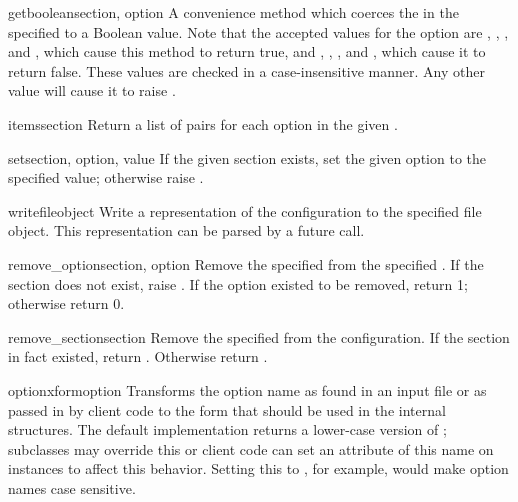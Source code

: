 \begin{methoddesc}{getboolean}{section, option}
A convenience method which coerces the  in the specified
 to a Boolean value.  Note that the accepted values
for the option are , , , and ,
which cause this method to return true, and , ,
, and , which cause it to return false.  These
values are checked in a case-insensitive manner.  Any other value will
cause it to raise .
\end{methoddesc}

\begin{methoddesc}{items}{section}
Return a list of  pairs for each
option in the given .
\end{methoddesc}

\begin{methoddesc}{set}{section, option, value}
If the given section exists, set the given option to the specified value;
otherwise raise .
\end{methoddesc}

\begin{methoddesc}{write}{fileobject}
Write a representation of the configuration to the specified file
object.  This representation can be parsed by a future 
call.
\end{methoddesc}

\begin{methoddesc}{remove_option}{section, option}
Remove the specified  from the specified .
If the section does not exist, raise . 
If the option existed to be removed, return 1; otherwise return 0.
\end{methoddesc}

\begin{methoddesc}{remove_section}{section}
Remove the specified  from the configuration.
If the section in fact existed, return .
Otherwise return .
\end{methoddesc}

\begin{methoddesc}{optionxform}{option}
Transforms the option name  as found in an input file or
as passed in by  client code to the form that should be used in the
internal structures.  The default implementation returns a lower-case
version of ; subclasses may override this or client code
can set an attribute of this name on instances to affect this
behavior.  Setting this to , for example, would make
option names case sensitive.
\end{methoddesc}


